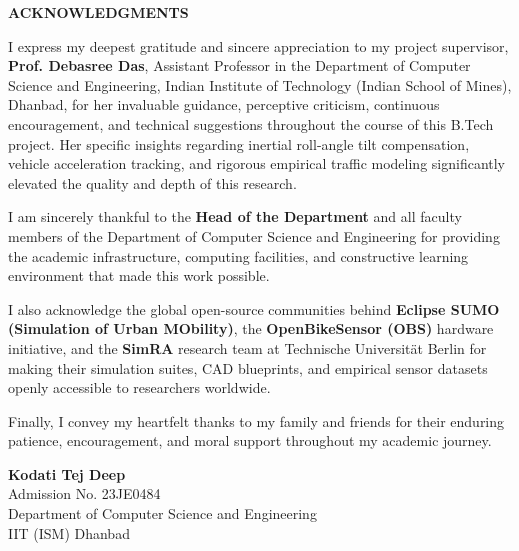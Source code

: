 \begin{center}
	\fontsize{16pt}{22pt}\selectfont \textbf{\MakeUppercase{Acknowledgments}}
\end{center}
\vspace{0.5cm}

\noindent I express my deepest gratitude and sincere appreciation to my project supervisor, \textbf{Prof. Debasree Das}, Assistant Professor in the Department of Computer Science and Engineering, Indian Institute of Technology (Indian School of Mines), Dhanbad, for her invaluable guidance, perceptive criticism, continuous encouragement, and technical suggestions throughout the course of this B.Tech project. Her specific insights regarding inertial roll-angle tilt compensation, vehicle acceleration tracking, and rigorous empirical traffic modeling significantly elevated the quality and depth of this research.

\noindent I am sincerely thankful to the \textbf{Head of the Department} and all faculty members of the Department of Computer Science and Engineering for providing the academic infrastructure, computing facilities, and constructive learning environment that made this work possible. 

\noindent I also acknowledge the global open-source communities behind \textbf{Eclipse SUMO (Simulation of Urban MObility)}, the \textbf{OpenBikeSensor (OBS)} hardware initiative, and the \textbf{SimRA} research team at Technische Universit{\"a}t Berlin for making their simulation suites, CAD blueprints, and empirical sensor datasets openly accessible to researchers worldwide.

\noindent Finally, I convey my heartfelt thanks to my family and friends for their enduring patience, encouragement, and moral support throughout my academic journey.

\vspace{1.5cm}
\noindent
\begin{flushright}
	\textbf{Kodati Tej Deep}\\
	Admission No. 23JE0484\\
	Department of Computer Science and Engineering\\
	IIT (ISM) Dhanbad
\end{flushright}
